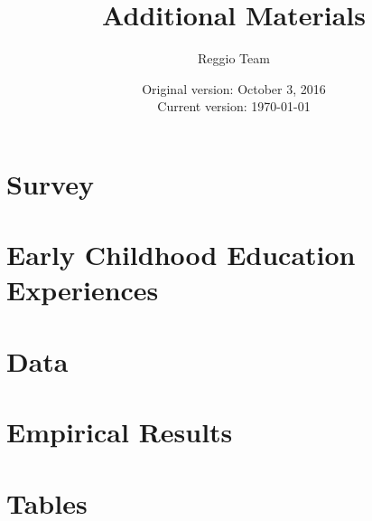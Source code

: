 




\title{\Large \textbf{Additional Materials}}
\author{\normalsize Reggio Team}
\date{\normalsize Original version: October 3, 2016 \\ Current version: \today}
\maketitle

\tableofcontents

\doublespacing

\begin{appendices}

\section{Survey}
\label{sec:survey}
 

\section{Early Childhood Education Experiences}
\label{sec:eceexperiences}


\section{Data}
\label{sec:data}


\section{Empirical Results}
\label{sec:results}


\section{Tables}
\label{sec:Appendix}


\end{appendices}





